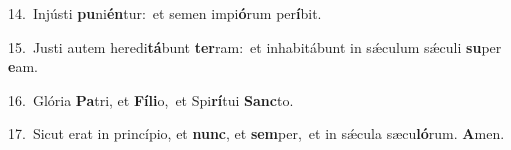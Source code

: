 {\numbfont\textcolor{\numbcolor}{14.}}~Injústi \textbf{pu}\-ni\-\textbf{én}\-tur:~\star et semen impi\-\textbf{ó}\-rum per\-\textbf{í}\-bit.\par
{\numbfont\textcolor{\numbcolor}{15.}}~Justi autem heredi\-\textbf{tá}\-bunt \textbf{ter}\-ram:~\star et inhabitábunt in sǽculum sǽculi \textbf{su}\-per \textbf{e}\-am.\par
{\numbfont\textcolor{\numbcolor}{16.}}~Glória \textbf{Pa}\-tri, et \textbf{Fí}\-\textbf{li}o,~\star et Spi\-\textbf{rí}\-tui \textbf{Sanc}\-to.\par
{\numbfont\textcolor{\numbcolor}{17.}}~Sicut erat in princípio, et \textbf{nunc}\-, et \textbf{sem}\-per,~\star et in sǽcula sæcu\-\textbf{ló}\-rum. \textbf{A}\-men.\par
